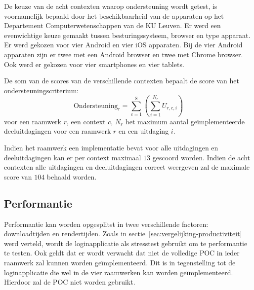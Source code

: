  \begin{table}[H]
 \centering
 \resizebox{\textwidth}{!} {
 }
 \caption{Acht contexten: apparaten met hun soort, lancering, besturingssysteem~(BS) en browser.}
 \label{tabel:toestellen-hci}
 \end{table}
 
De keuze van de acht contexten waarop ondersteuning wordt getest, is voornamelijk bepaald door het beschikbaarheid van de apparaten op het Departement Computerwetenschappen van de KU Leuven.
Er werd een evenwichtige keuze gemaakt tussen besturingssysteem,  browser en type apparaat.
Er werd gekozen voor vier Android en vier iOS apparaten.
Bij de vier Android apparaten zijn er twee met een Android browser en twee met Chrome browser.
Ook werd er gekozen voor vier smartphones en vier tablets.

De som van de scores van de verschillende contexten bepaalt de score van het ondersteuningscriterium:
\begin{equation}
  \text{Ondersteuning}_r = \sum_{c=1}^{8}{\left(\sum_{i=1}^{N_r}U_{r,c,i}\right)}
  \label{eq:ondersteuning}
\end{equation}
voor  een raamwerk $r$, een context $c$, $N_r$ het maximum aantal geïmplementeerde deeluitdagingen voor een raamwerk $r$ en een uitdaging $i$. 


Indien het raamwerk een implementatie bevat voor alle uitdagingen en deeluitdagingen kan er per context maximaal $13$ gescoord worden.
Indien de acht contexten alle uitdagingen en deeluitdagingen correct weergeven zal de maximale score van $104$ behaald worden.


\subsection{Performantie}
\label{sec:vergelijking-performantie}
Performantie kan worden opgesplitst in twee verschillende factoren: downloadtijden en rendertijden.
Zoals in sectie~\ref{sec:vergelijking-productiviteit} werd verteld, wordt de loginapplicatie als stresstest gebruikt om te performantie te testen.
Ook geldt dat er wordt verwacht dat niet de volledige POC in ieder raamwerk zal kunnen worden geïmplementeerd. 
Dit is in tegenstelling tot de loginapplicatie die wel in de vier raamwerken kan worden geïmplementeerd.
Hierdoor zal de POC niet worden gebruikt.

